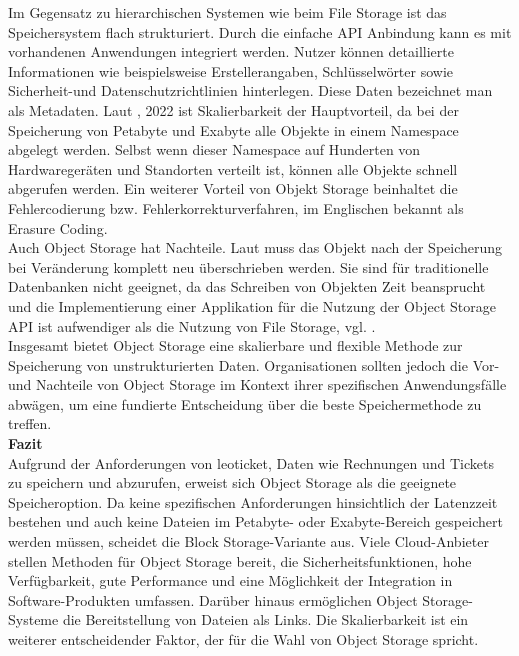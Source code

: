 Im Gegensatz zu hierarchischen Systemen wie beim File Storage ist das Speichersystem flach strukturiert. Durch die einfache API Anbindung kann es mit vorhandenen Anwendungen integriert werden. Nutzer können detaillierte Informationen wie beispielsweise Erstellerangaben, Schlüsselwörter sowie Sicherheit-und Datenschutzrichtlinien hinterlegen. Diese Daten bezeichnet man als Metadaten. Laut \citeauthor{nx-fileScala}, 2022 ist Skalierbarkeit der Hauptvorteil, da bei der Speicherung von Petabyte und Exabyte alle Objekte in einem Namespace abgelegt werden. Selbst wenn dieser Namespace auf Hunderten von Hardwaregeräten und Standorten verteilt ist, können alle Objekte schnell abgerufen werden. Ein weiterer Vorteil von Objekt Storage beinhaltet die Fehlercodierung bzw. Fehlerkorrekturverfahren, im Englischen bekannt als \glqq Erasure Coding\grqq.\\

Auch Object Storage hat Nachteile. Laut \citeauthor{rH-storage} muss das Objekt nach der Speicherung bei Veränderung komplett neu überschrieben werden. Sie sind für traditionelle Datenbanken nicht geeignet, da das Schreiben von Objekten Zeit beansprucht und die Implementierung einer Applikation für die Nutzung der Object Storage API ist aufwendiger als die Nutzung von File Storage, vgl. \citeauthor{rH-storage}.\\

Insgesamt bietet Object Storage eine skalierbare und flexible Methode zur Speicherung von unstrukturierten Daten. Organisationen sollten jedoch die Vor- und Nachteile von Object Storage im Kontext ihrer spezifischen Anwendungsfälle abwägen, um eine fundierte Entscheidung über die beste Speichermethode zu treffen.\\


\textbf{Fazit}\\

Aufgrund der Anforderungen von leoticket, Daten wie Rechnungen und Tickets zu speichern und abzurufen, erweist sich Object Storage als die geeignete Speicheroption. Da keine spezifischen Anforderungen hinsichtlich der Latenzzeit bestehen und auch keine Dateien im Petabyte- oder Exabyte-Bereich gespeichert werden müssen, scheidet die Block Storage-Variante aus. Viele Cloud-Anbieter stellen Methoden für Object Storage bereit, die Sicherheitsfunktionen, hohe Verfügbarkeit, gute Performance und eine Möglichkeit der Integration in Software-Produkten umfassen. Darüber hinaus ermöglichen Object Storage-Systeme die Bereitstellung von Dateien als Links. Die Skalierbarkeit ist ein weiterer entscheidender Faktor, der für die Wahl von Object Storage spricht.

